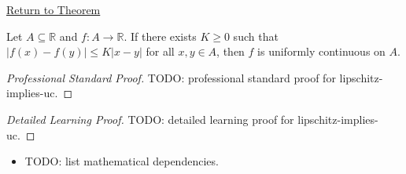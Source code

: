 \newpage
{}
\label{prf:lipschitz-implies-uc}

\begin{remark*}[Return]
\hyperref[prop:lipschitz-implies-uc]{Return to Theorem}
\end{remark*}

\begin{proposition*}
Let $A \subseteq \mathbb{R}$ and $f:A \to \mathbb{R}$. If there exists $K \ge 0$ such that $|f(x)-f(y)| \le K |x-y|$ for all $x,y \in A$, then $f$ is uniformly continuous on $A$.
\end{proposition*}

\begin{proof}[Professional Standard Proof]
\LRAProofBodyStart
TODO: professional standard proof for lipschitz-implies-uc.
\end{proof}

\begin{proof}[Detailed Learning Proof]
\LRAProofBodyStart
TODO: detailed learning proof for lipschitz-implies-uc.
\end{proof}

\begin{remark*}
\end{remark*}

\begin{dependencies}
\begin{itemize}
  \item TODO: list mathematical dependencies.
\end{itemize}
\end{dependencies}

\clearpage
